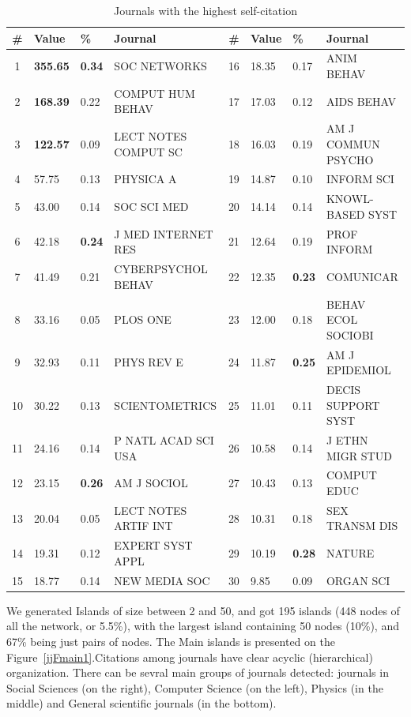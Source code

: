 \documentclass[11pt]{article} %
\begin{document}
\begin{table}
\caption{Journals with the highest self-citation} \label{jselfcite}\medskip
\renewcommand{\arraystretch}{0.95}
\small
\begin{center}
\begin{tabular}{c|l|l|l|c|l|l|l|} 
\# &	Value& \% &	Journal &  \# &	Value& \% & Journal \\ \hline 
1 &	\textbf{355.65}&	\textbf{0.34}&	SOC NETWORKS&	16&	       18.35 &    0.17	  &     ANIM BEHAV\\
2 &	\textbf{168.39}&	0.22&	COMPUT HUM BEHAV&	17&    17.03 & 	  0.12	  &     AIDS BEHAV\\
3 &	\textbf{122.57}&	0.09&	LECT NOTES COMPUT SC&	18&    16.03 & 	  0.19	  &     AM J COMMUN PSYCHO \\
4 &	57.75&	0.13&	PHYSICA A&	19&	       14.87 &	  0.10	  &     INFORM SCI\\
5 &	43.00&	0.14&	SOC SCI MED&	20&	       14.14 &	  0.14	  &     KNOWL-BASED SYST\\
6 &	42.18&	\textbf{0.24}&	J MED INTERNET RES&	21&    12.64 &	  0.19	  &     PROF INFORM\\
7 &	41.49&	0.21&	CYBERPSYCHOL BEHAV&	22&    12.35 & 	 \textbf{0.23}	  &     COMUNICAR\\
8 &	33.16&	0.05&	PLOS ONE&	23&	       12.00 & 	  0.18	  &     BEHAV ECOL SOCIOBI \\
9 &	32.93&	0.11&	PHYS REV E&	24&	       11.87 & 	  \textbf{0.25}	  &     AM J EPIDEMIOL\\
10 &	30.22&	0.13&	SCIENTOMETRICS&	25&	       11.01 & 	  0.11	  &     DECIS SUPPORT SYST \\
11 &	24.16&	0.14&	P NATL ACAD SCI USA&	26&    10.58 & 	  0.14	  &     J ETHN MIGR STUD\\
12 &	23.15&	\textbf{0.26}&	AM J SOCIOL&	27&	       10.43 & 	  0.13	  &     COMPUT EDUC\\
13 &	20.04&	0.05&	LECT NOTES ARTIF INT&	28&    10.31 & 	  0.18	  &     SEX TRANSM DIS\\
14 &	19.31&	0.12&	EXPERT SYST APPL&	29&    10.19 & 	 \textbf{0.28}	  &     NATURE\\
15 &	18.77&	0.14&	NEW MEDIA SOC&	30&	       9.85 & 	  0.09	  &     ORGAN SCI\\ \hline 
\end{tabular} 
\end{center}
\end{table}  

We generated Islands of size between 2 and 50, and got 195 islands (448 nodes of all the network, or 5.5\%), with the largest island containing 50 nodes (10\%), and 67\% being just pairs of nodes. The Main islands is presented on the Figure~\ref{jjFmain1}.Citations among journals have clear acyclic (hierarchical) organization. There can be sevral main groups of journals detected: journals in Social Sciences (on the right), Computer Science (on the left), Physics (in the middle) and General scientific journals (in the bottom).  \medskip 
\end{document}

